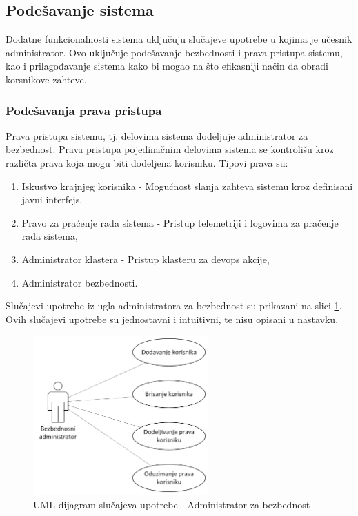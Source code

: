\documentclass[12pt,oneside]{memoir}
\begin{document}
\subsection{Podešavanje sistema}
Dodatne funkcionalnosti sistema uključuju slučajeve upotrebe u kojima je učesnik administrator. Ovo uključuje podešavanje bezbednosti i prava pristupa sistemu, kao i prilagođavanje sistema kako bi mogao na što efikasniji način da obradi korsnikove zahteve.


\subsubsection{Podešavanja prava pristupa}
Prava pristupa sistemu, tj. delovima sistema dodeljuje administrator za bezbednost. Prava pristupa pojedinačnim delovima sistema se kontrolišu kroz različta prava koja mogu biti dodeljena korisniku. Tipovi prava su:
	\begin{enumerate}
	\item Iskustvo krajnjeg korisnika - Mogućnost slanja zahteva sistemu kroz definisani javni interfejs,
	\item Pravo za praćenje rada sistema - Pristup telemetriji i logovima za praćenje rada sistema,
	\item Administrator klastera - Pristup klasteru za devops akcije,
	\item Administrator bezbednosti.
	\end{enumerate}
Slučajevi upotrebe iz ugla administratora za bezbednost su prikazani na slici \ref{fig:slucajupotrebe_aadadmin}. Ovih slučajevi upotrebe su jednostavni i intuitivni, te nisu opisani u nastavku.

\begin{figure}[!ht]
  \centering
  \includegraphics[width=0.6\textwidth]{./images/dijagram_slucajeva_upotrebe_administrator_sistema_aadadmin.png}
  \caption{UML dijagram slučajeva upotrebe - Administrator za bezbednost}
  \label{fig:slucajupotrebe_aadadmin}
\end{figure}
\end{document}
